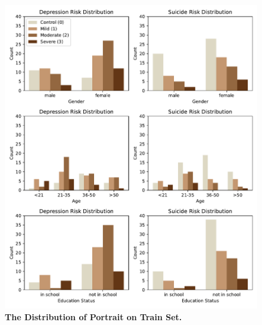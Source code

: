 \begin{figure}[!t]
    \centering
    \includegraphics[width=\linewidth]{fig/distribution_train.pdf}
    \caption{\textbf{The Distribution of Portrait on Train Set.}}
    \label{fig:portrait distribution train}
\end{figure}


